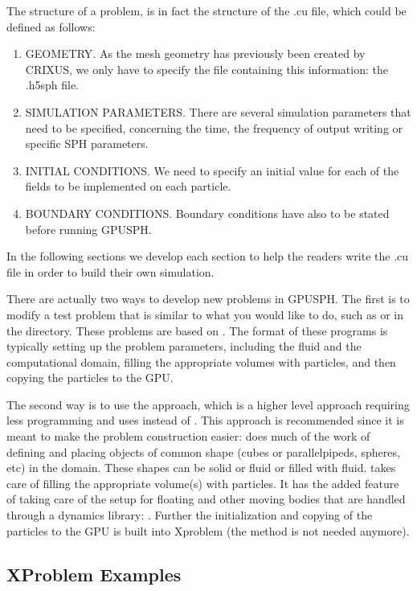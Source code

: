 \documentclass{../GPUSPHtemplate}
\begin{document}
The structure of a problem, is in fact the structure of the .cu file, 
which could be defined as follows:
\begin{enumerate}
\item GEOMETRY. As the mesh geometry has previously been 
created by CRIXUS, we only have to specify the file 
containing this information: the .h5sph file.
\item SIMULATION PARAMETERS. There are several simulation 
parameters that need to be specified, concerning the time, 
the frequency of output writing or specific SPH parameters.
\item INITIAL CONDITIONS. We need to specify an initial 
value for each of the fields to be implemented on each particle.
\item BOUNDARY CONDITIONS. Boundary conditions 
have also to be stated before running GPUSPH.
\end{enumerate}
In the following sections we develop each section to help 
the readers write the .cu file in order to build their own simulation.

There are actually two ways to develop new problems in GPUSPH.  
The first is to modify a test problem that is similar to what you would like to do, 
such as  or  in the  directory.  
These problems are based on .  
The format of these programs is typically setting up the problem parameters, 
including the fluid and the computational domain, 
filling the appropriate volumes with particles, 
and then copying the particles to the GPU.

The second way is to use the  approach, which is a higher 
level approach requiring less programming and uses  
instead of . This approach is recommended since it is meant to make 
the problem construction easier:
 does much of the work of defining and placing objects of common shape 
(cubes or parallelpipeds, spheres, etc)  in the domain.  
These shapes can be solid or fluid or filled with fluid.  
 takes care of filling the appropriate volume(s) with particles.   
It has the added feature of taking care of the setup for floating and other moving 
bodies that are handled through a dynamics library:  .  
Further the initialization and copying of the particles to the GPU is built into Xproblem 
(the  method is not needed anymore).  

\subsection{XProblem Examples}
\end{document}
